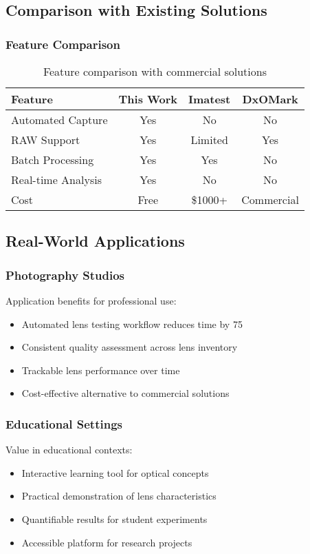 \subsection{Comparison with Existing Solutions}

\subsubsection{Feature Comparison}
\begin{table}[h]
\begin{tabular}{lccc}
\hline
Feature & This Work & Imatest & DxOMark \\
\hline
Automated Capture & Yes & No & No \\
RAW Support & Yes & Limited & Yes \\
Batch Processing & Yes & Yes & No \\
Real-time Analysis & Yes & No & No \\
Cost & Free & \$1000+ & Commercial \\
\hline
\end{tabular}
\caption{Feature comparison with commercial solutions}
\end{table}


\subsection{Real-World Applications}

\subsubsection{Photography Studios}
Application benefits for professional use:
\begin{itemize}
    \item Automated lens testing workflow reduces time by 75%
    \item Consistent quality assessment across lens inventory
    \item Trackable lens performance over time
    \item Cost-effective alternative to commercial solutions
\end{itemize}

\subsubsection{Educational Settings}
Value in educational contexts:
\begin{itemize}
    \item Interactive learning tool for optical concepts
    \item Practical demonstration of lens characteristics
    \item Quantifiable results for student experiments
    \item Accessible platform for research projects
\end{itemize}

